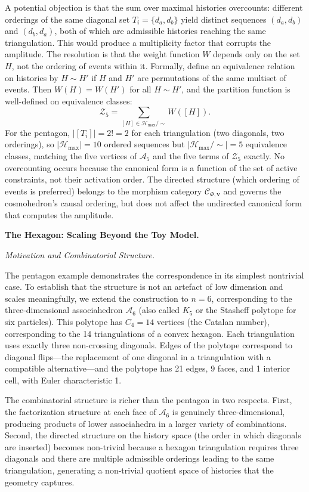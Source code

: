 \documentclass[11pt]{article}
\theoremstyle{plain}
\theoremstyle{definition}
\theoremstyle{remark}
\newcommand{\Ccat}{\mathcal{C}_{\Phi,\mathbf{v}}}
\newcommand{\Hmax}{\mathcal{H}_{\max}}
\begin{document}
A potential objection is that the sum over maximal histories overcounts: different orderings of the same diagonal set $T_i = \{d_a, d_b\}$ yield distinct sequences $(d_a, d_b)$ and $(d_b, d_a)$, both of which are admissible histories reaching the same triangulation. This would produce a multiplicity factor that corrupts the amplitude. The resolution is that the weight function $W$ depends only on the set $H$, not the ordering of events within it. Formally, define an equivalence relation on histories by $H \sim H'$ if $H$ and $H'$ are permutations of the same multiset of events. Then $W(H) = W(H')$ for all $H \sim H'$, and the partition function is well-defined on equivalence classes: \[
  \mathcal{Z}_5 = \sum_{[H] \in \Hmax/\!\sim} W([H]).
\]
For the pentagon, $|[T_i]| = 2! = 2$ for each triangulation (two diagonals, two orderings), so $|\Hmax| = 10$ ordered sequences but $|\Hmax/\!\sim| = 5$ equivalence classes, matching the five vertices of $\mathcal{A}_5$ and the five terms of $\mathcal{Z}_5$ exactly. No overcounting occurs because the canonical form is a function of the set of active constraints, not their activation order. The directed structure (which ordering of events is preferred) belongs to the morphism category $\Ccat$ and governs the cosmohedron's causal ordering, but does not affect the undirected canonical form that computes the amplitude.

\bigskip\noindent\textbf{The Hexagon: Scaling Beyond the Toy Model.}
\label{sec:hexagon}

\medskip\noindent\textit{Motivation and Combinatorial Structure.}

The pentagon example demonstrates the correspondence in its simplest nontrivial case. To establish that the structure is not an artefact of low dimension and scales meaningfully, we extend the construction to $n = 6$, corresponding to the three-dimensional associahedron $\mathcal{A}_6$ (also called $K_5$ or the Stasheff polytope for six particles). This polytope has $C_4 = 14$ vertices (the Catalan number), corresponding to the 14 triangulations of a convex hexagon. Each triangulation uses exactly three non-crossing diagonals. Edges of the polytope correspond to diagonal flips---the replacement of one diagonal in a triangulation with a compatible alternative---and the polytope has 21 edges, 9 faces, and 1 interior cell, with Euler characteristic 1.

The combinatorial structure is richer than the pentagon in two respects. First, the factorization structure at each face of $\mathcal{A}_6$ is genuinely three-dimensional, producing products of lower associahedra in a larger variety of combinations. Second, the directed structure on the history space (the order in which diagonals are inserted) becomes non-trivial because a hexagon triangulation requires three diagonals and there are multiple admissible orderings leading to the same triangulation, generating a non-trivial quotient space of histories that the geometry captures.
\end{document}
